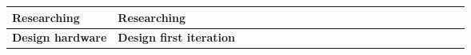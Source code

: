 \begin{table}[ht!]
\begin{tabular}{lp{2.5in}|llllllllllllllllllll|}
    \multicolumn{1}{|l|}{\cellcolor[HTML]{00E2FF}\textbf{Researching}}     & \cellcolor[HTML]{00E2FF}\textbf{Researching}                               & \multicolumn{1}{l|}{}                                   & \multicolumn{1}{l|}{}                                   & \multicolumn{1}{l|}{\cellcolor[HTML]{F8A102}}           & \multicolumn{1}{l|}{\cellcolor[HTML]{F8A102}}           & \multicolumn{1}{l|}{}                                   & \multicolumn{1}{l|}{}                                   & \multicolumn{1}{l|}{}                                   & \multicolumn{1}{l|}{}                                   & \multicolumn{1}{l|}{}                                   & \multicolumn{1}{l|}{}                                    & \multicolumn{1}{l|}{}                                    & \multicolumn{1}{l|}{}                                    & \multicolumn{1}{l|}{}                                    & \multicolumn{1}{l|}{}                                    & \multicolumn{1}{l|}{}                                    & \multicolumn{1}{l|}{}                                    & \multicolumn{1}{l|}{}                                    & \multicolumn{1}{l|}{}                                    & \multicolumn{1}{l|}{}                                    &             \\ \hline
    \multicolumn{1}{|l|}{\cellcolor[HTML]{00E2FF}\textbf{Design hardware}} & \cellcolor[HTML]{00E2FF}\textbf{Design first iteration}                    & \multicolumn{1}{l|}{}                                   & \multicolumn{1}{l|}{}                                   & \multicolumn{1}{l|}{}                                   & \multicolumn{1}{l|}{}                                   & \multicolumn{1}{l|}{\cellcolor[HTML]{F8A102}}           & \multicolumn{1}{l|}{\cellcolor[HTML]{F8A102}}           & \multicolumn{1}{l|}{\cellcolor[HTML]{F8A102}}           & \multicolumn{1}{l|}{}                                   & \multicolumn{1}{l|}{}                                   & \multicolumn{1}{l|}{}                                    & \multicolumn{1}{l|}{}                                    & \multicolumn{1}{l|}{}                                    & \multicolumn{1}{l|}{}                                    & \multicolumn{1}{l|}{}                                    & \multicolumn{1}{l|}{}                                    & \multicolumn{1}{l|}{}                                    & \multicolumn{1}{l|}{}                                    & \multicolumn{1}{l|}{}                                    & \multicolumn{1}{l|}{}                                    &             \\ \hline

\end{tabular}
\end{table}
